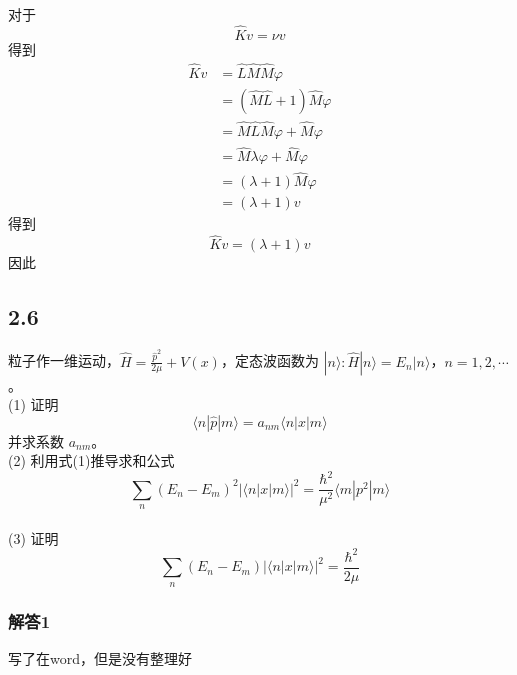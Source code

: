 对于
\begin{equation}
    \hat{K}v=\nu v
\end{equation}
得到
\begin{equation}
    \begin{aligned}
        \hat{K}v&=\hat{L}\hat{M}\hat{M}\varphi 
\\
&=\left( \hat{M}\hat{L}+1 \right) \hat{M}\varphi 
\\
&=\hat{M}\hat{L}\hat{M}\varphi +\hat{M}\varphi 
\\
&=\hat{M}\lambda \varphi +\hat{M}\varphi 
\\
&=\left( \lambda +1 \right) \hat{M}\varphi 
\\
&=\left( \lambda +1 \right) v
    \end{aligned}
\end{equation}
得到
\begin{equation}
    \hat{K}v=\left( \lambda +1 \right) v
\end{equation}
因此

\newpage
\subsection{2.6}
粒子作一维运动，$\hat{H} = \frac{\hat{p}^2}{2\mu} + V(x)$，定态波函数为 $|n\rangle : \hat{H}|n\rangle = E_n |n\rangle$，$n = 1, 2, \cdots$。
\\(1) 证明
$$\langle n | \hat{p} | m \rangle = a_{nm} \langle n | x | m \rangle $$
并求系数 $a_{nm}$。
\\(2) 利用式(1)推导求和公式
$$\sum_n (E_n - E_m)^2 | \langle n | x | m \rangle |^2 = \frac{\hbar^2}{\mu^2} \langle m | p^2 | m \rangle $$
\\(3) 证明
$$\sum_n (E_n - E_m) | \langle n | x | m \rangle |^2 = \frac{\hbar^2}{2\mu} $$


\subsubsection{解答1}
写了在word，但是没有整理好

